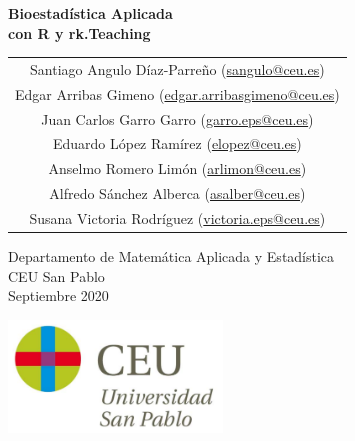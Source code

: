 \begin{titlepage}
\thispagestyle{empty}
\vspace*{7cm}
\par

\begin{center}
\normalfont\fontsize{30}{30}\selectfont
{\bfseries \color{blueceu}Bioestadística Aplicada\\ con R y rk.Teaching}
\end{center}
\vspace{1cm}

\begin{center}
\Large
\begin{tabular}{c}
Santiago Angulo Díaz-Parreño (\url{sangulo@ceu.es})\\
Edgar Arribas Gimeno (\url{edgar.arribasgimeno@ceu.es})\\
Juan Carlos Garro Garro (\url{garro.eps@ceu.es})\\
Eduardo López Ramírez (\url{elopez@ceu.es})\\
Anselmo Romero Limón (\url{arlimon@ceu.es})\\
Alfredo Sánchez Alberca (\url{asalber@ceu.es})\\
Susana Victoria Rodríguez (\url{victoria.eps@ceu.es})
\end{tabular}

\medskip 
Departamento de Matemática Aplicada y Estadística\\ CEU San Pablo\\[1cm]
\medskip 
Septiembre 2020

\vspace{1cm}
\includegraphics[height=3cm]{img/logo_uspceu}
\end{center}
\vfill
\end{titlepage}